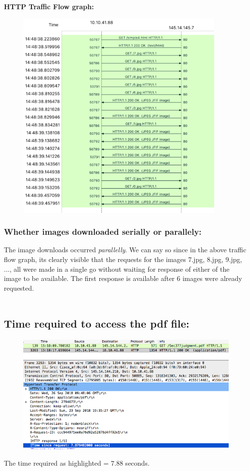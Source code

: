 \documentclass[]{report}
\begin{document}
\textbf{HTTP Traffic Flow graph:}
\begin{figure}[H]
	\vspace{0pt}
	\includegraphics[height = 300pt, keepaspectratio]{Snapshots/q1/simple4/1_4_9.png}
\end{figure}
\subsubsection{Whether images downloaded serially or parallely:}
The image downloads occurred \textit{parallelly}. We can say so since in the above traffic flow graph, its clearly visible that the requests for the images 7.jpg, 8.jpg, 9.jpg, ..., all were made in a single go without waiting for response of either of the image to be available. The first response is available after 6 images were already requested. \\ \\
\subsection{Time required to access the pdf file:}
\begin{figure}[H]
	\vspace{0pt}
	\includegraphics[height = 170pt, keepaspectratio]{Snapshots/q1/1_13.png}
\end{figure}
The time required as highlighted = $7.88$ seconds. \\ \\ \\ \\
\end{document}
